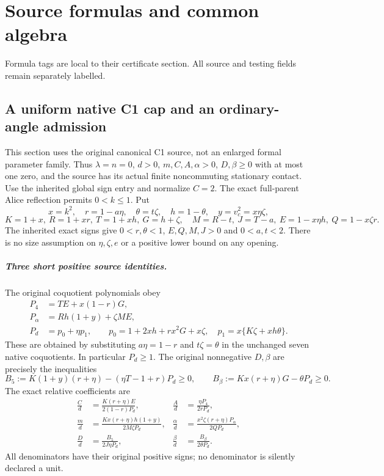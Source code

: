 \chapter{Source formulas and common algebra}
\label{ch:cert-1}
Formula tags are local to their certificate section. All source and testing fields remain separately labelled.

\section{\texorpdfstring{A uniform native C1 cap and an ordinary-angle admission}{A uniform native C1 cap and an ordinary-angle admission}}
\label{component:p42ee07a067c1}

\label{p42ee07a067c1:sec:c1-global-native-cap}

This section uses the original canonical C1 source, not an enlarged
formal parameter family. Thus $\lambda=n=0$, $d>0$, $m,C,A,\alpha>0$,
$D,\beta\ge0$ with at most one zero, and the source has its actual
finite noncommuting stationary contact. Use the inherited global sign
entry and normalize $C=2$. The exact full-parent Alice reflection
permits $0<k\le1$. Put
\[
 x=k^2,\quad r=1-a\eta,\quad\theta=t\zeta,\quad
 h=1-\theta,\quad y=v_c^2=x\eta\zeta,
\]
\[
 K=1+x,\ R=1+xr,\ T=1+xh,\ G=h+\zeta,
 \quad M=R-t,\ J=T-a,\ E=1-x\eta h,\ Q=1-x\zeta r.
 \tag{NC1}
\]
The inherited exact signs give $0<r,\theta<1$, $E,Q,M,J>0$ and
$0<a,t<2$. There is no size assumption on $\eta,\zeta,e$ or a
positive lower bound on any opening.

\paragraph{Three short positive source identities.}
The original coquotient polynomials obey
\begin{align*}
 P_4&=TE+x(1-r)G,\\
 P_\alpha&=Rh(1+y)+\zeta ME,\\
 P_d&=p_0+\eta p_1,\qquad
 p_0=1+2xh+rx^2G+x\zeta,\quad
 p_1=x\{K\zeta+xh\theta\}.
 \tag{NC2}
\end{align*}
These are obtained by substituting $a\eta=1-r$ and $t\zeta=\theta$
in the unchanged seven native coquotients. In particular $P_d\ge1$.
The original nonnegative $D,\beta$ are precisely the inequalities
\[
 B_5:=K(1+y)(r+\eta)-(\eta T-1+r)P_d\ge0,
 \qquad B_\beta:=Kx(r+\eta)G-\theta P_d\ge0.
 \tag{NC3}
\]
The exact relative coefficients are
\begin{align*}
 \frac C d&=\frac{K(r+\eta)E}{2(1-r)P_d},&
 \frac A d&=\frac{\eta P_4}{2rP_d},\\
 \frac m d&=\frac{Kx(r+\eta)h(1+y)}{2M\zeta P_d},&
 \frac\alpha d&=\frac{x^2\zeta(r+\eta)P_\alpha}{2QP_d},\\
 \frac Dd&=\frac{B_5}{2J\eta P_d},&
 \frac\beta d&=\frac{B_\beta}{2\theta P_d}.
 \tag{NC4}
\end{align*}
All denominators have their original positive signs; no denominator is
silently declared a unit.

